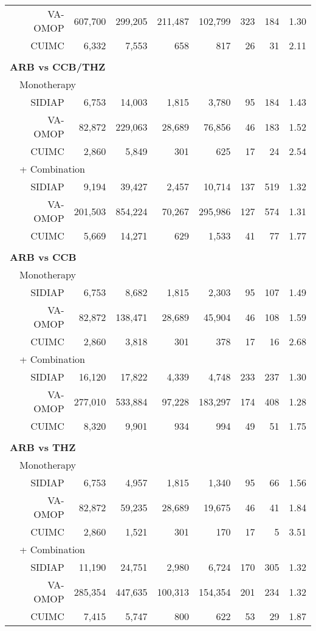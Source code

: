 \documentclass[11pt,]{article}
\begin{document}
\begin{longtable}{p{-2em}p{-2em}rrrrrrrr}
   &  & VA-OMOP & 607,700 & 299,205 & 211,487 & 102,799 & 323 & 184 & 1.30 \\ 
   &  & CUIMC & 6,332 & 7,553 & 658 & 817 & 26 & 31 & 2.11 \\ 
   \rowcolor{white} \\ \multicolumn{9}{l}{\textbf{ARB vs CCB/THZ}} \\ & \multicolumn{9}{l}{Monotherapy}  \\ &  & SIDIAP & 6,753 & 14,003 & 1,815 & 3,780 & 95 & 184 & 1.43 \\ 
   &  & VA-OMOP & 82,872 & 229,063 & 28,689 & 76,856 & 46 & 183 & 1.52 \\ 
   &  & CUIMC & 2,860 & 5,849 & 301 & 625 & 17 & 24 & 2.54 \\ 
                           & \multicolumn{8}{l}{+ Combination} \\ &  & SIDIAP & 9,194 & 39,427 & 2,457 & 10,714 & 137 & 519 & 1.32 \\ 
   &  & VA-OMOP & 201,503 & 854,224 & 70,267 & 295,986 & 127 & 574 & 1.31 \\ 
   &  & CUIMC & 5,669 & 14,271 & 629 & 1,533 & 41 & 77 & 1.77 \\ 
   \rowcolor{white} \\ \multicolumn{9}{l}{\textbf{ARB vs CCB}} \\ & \multicolumn{9}{l}{Monotherapy}  \\ &  & SIDIAP & 6,753 & 8,682 & 1,815 & 2,303 & 95 & 107 & 1.49 \\ 
   &  & VA-OMOP & 82,872 & 138,471 & 28,689 & 45,904 & 46 & 108 & 1.59 \\ 
   &  & CUIMC & 2,860 & 3,818 & 301 & 378 & 17 & 16 & 2.68 \\ 
                           & \multicolumn{8}{l}{+ Combination} \\ &  & SIDIAP & 16,120 & 17,822 & 4,339 & 4,748 & 233 & 237 & 1.30 \\ 
   &  & VA-OMOP & 277,010 & 533,884 & 97,228 & 183,297 & 174 & 408 & 1.28 \\ 
   &  & CUIMC & 8,320 & 9,901 & 934 & 994 & 49 & 51 & 1.75 \\ 
   \rowcolor{white} \\ \multicolumn{9}{l}{\textbf{ARB vs THZ}} \\ & \multicolumn{9}{l}{Monotherapy}  \\ &  & SIDIAP & 6,753 & 4,957 & 1,815 & 1,340 & 95 & 66 & 1.56 \\ 
   &  & VA-OMOP & 82,872 & 59,235 & 28,689 & 19,675 & 46 & 41 & 1.84 \\ 
   &  & CUIMC & 2,860 & 1,521 & 301 & 170 & 17 & 5 & 3.51 \\ 
                           & \multicolumn{8}{l}{+ Combination} \\ &  & SIDIAP & 11,190 & 24,751 & 2,980 & 6,724 & 170 & 305 & 1.32 \\ 
   &  & VA-OMOP & 285,354 & 447,635 & 100,313 & 154,354 & 201 & 234 & 1.32 \\ 
   &  & CUIMC & 7,415 & 5,747 & 800 & 622 & 53 & 29 & 1.87 \\ 
  
  \bottomrule
\end{longtable}
\end{document}
